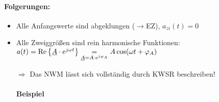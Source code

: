 \paragraph{Folgerungen:}
\begin{itemize}
  \item Alle Anfangswerte sind abgeklungen ($\rightarrow$EZ), $a_{zi}(t)=0$
  
  \item Alle Zweiggrößen sind rein harmonische Funktionen:\\
    $a(t)=\operatorname{Re}\left\{\underline{A}\cdot e^{j\omega t}\right\}
    \underset{\underline{A}=A\cdot e^{j\varphi_A}}{=}
    A\cos(\omega t+\varphi_A)$
    
    $\Rightarrow$ Das NWM lässt sich vollständig durch \acs{KWSR} beschreiben!
    
    \paragraph{Beispiel}
    

\end{itemize}
